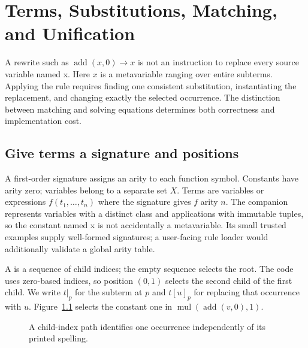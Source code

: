 \chapter{Terms, Substitutions, Matching, and Unification}
\label{ch:term-matching-unification}

A rewrite such as $\operatorname{add}(x,0)\to x$ is not an instruction to replace every source variable named x.
Here $x$ is a metavariable ranging over entire subterms.
Applying the rule requires finding one consistent substitution, instantiating the replacement, and changing exactly the selected occurrence.
The distinction between matching and solving equations determines both correctness and implementation cost.

\section{Give terms a signature and positions}
\label{sec:ch82-signature}
A first-order signature assigns an arity to each function symbol.
Constants have arity zero; variables belong to a separate set $X$.
Terms are variables or expressions $f(t_1,\ldots,t_n)$ where the signature gives $f$ arity $n$.
The companion represents variables with a distinct  class and applications with immutable tuples, so the constant named x is not accidentally a metavariable.
Its small trusted examples supply well-formed signatures; a user-facing rule loader would additionally validate a global arity table.

A  is a sequence of child indices; the empty sequence selects the root.
The code uses zero-based indices, so position $(0,1)$ selects the second child of the first child.
We write $t|_p$ for the subterm at $p$ and $t[u]_p$ for replacing that occurrence with $u$.
Figure~\ref{fig:ch82-position} selects the constant one in $\operatorname{mul}(\operatorname{add}(v,0),1)$.

\begin{figure}[htbp]
\centering
{}
\caption{A child-index path identifies one occurrence independently of its printed spelling.}
\label{fig:ch82-position}
\end{figure}

